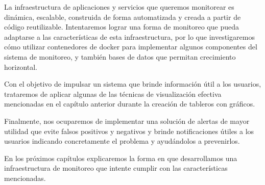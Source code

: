 La infraestructura de aplicaciones y servicios que queremos monitorear es
dinámica, escalable, construida de forma automatizada y creada a partir de
código reutilizable. Intentaremos lograr una forma de monitoreo que pueda
adaptarse a las características de esta infraestructura, por lo que
investigaremos cómo utilizar contenedores de docker para implementar algunos
componentes del sistema de monitoreo, y también bases de datos que permitan
crecimiento horizontal.

Con el objetivo de impulsar un sistema que brinde información útil a los
usuarios, trataremos de aplicar algunas de las técnicas de visualización
efectiva mencionadas en el capítulo anterior durante la creación de tableros
con gráficos.

Finalmente, nos ocuparemos de implementar una solución de alertas de mayor
utilidad que evite falsos positivos y negativos y brinde notificaciones útiles
a los usuarios indicando concretamente el problema y ayudándolos a prevenirlos.

En los próximos capítulos explicaremos la forma en que desarrollamos una
infraestructura de monitoreo que intente cumplir con las características
mencionadas.

